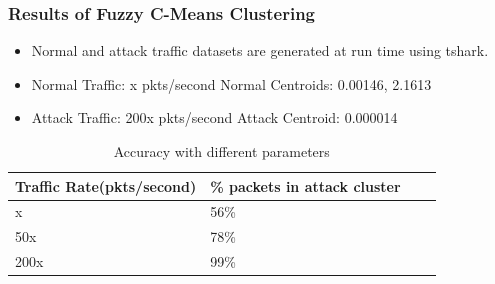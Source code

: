 \documentclass[10pt]{beamer}
\begin{document}
\begin{frame}
\frametitle{Results of Fuzzy C-Means Clustering}

\begin{itemize}
\footnotesize
\item
Normal and attack traffic datasets are generated at run time using tshark.

\item
Normal Traffic: x pkts/second
\newline
Normal Centroids: 0.00146, 2.1613

\item
Attack Traffic: 200x pkts/second
\newline
Attack Centroid: 0.000014
\end{itemize}

\begin{table}
\scriptsize
\begin{center}
\begin{tabular}{ | m{2cm} | m{2cm}| m{2cm} | m{2cm} |} 
\hline
\textbf{Traffic Rate(pkts/second)} & \textbf{\% packets in attack cluster} \\
\hline
x &
56\% \\
\hline
50x &
78\% \\
\hline
200x &
99\% \\
\hline
\end{tabular}
\end{center}
\caption{\footnotesize Accuracy with different parameters}
\end{table}
\end{frame}
\end{document}
